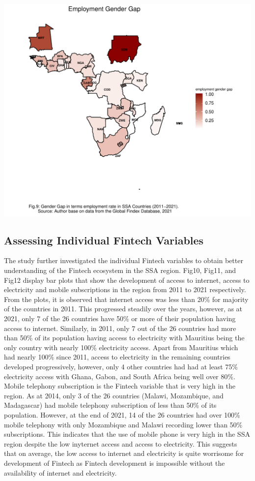 \documentclass[preprint, 3p,
authoryear]{elsarticle} %
\begin{document}
\includegraphics{504.Project1_files/figure-latex/unnamed-chunk-5-1.pdf}

\hypertarget{assessing-individual-fintech-variables}{%
\subsection{Assessing Individual Fintech
Variables}\label{assessing-individual-fintech-variables}}

The study further investigated the individual Fintech variables to
obtain better understanding of the Fintech ecosystem in the SSA region.
Fig10, Fig11, and Fig12 display bar plots that show the development of
access to internet, access to electricity and mobile subscriptions in
the region from 2011 to 2021 respectively. From the plots, it is
observed that internet access was less than 20\% for majority of the
countries in 2011. This progressed steadily over the years, however, as
at 2021, only 7 of the 26 countries have 50\% or more of their
population having access to internet. Similarly, in 2011, only 7 out of
the 26 countries had more than 50\% of its population having access to
electricity with Mauritius being the only country with nearly 100\%
electricity access. Apart from Mauritius which had nearly 100\% since
2011, access to electricity in the remaining countries developed
progressively, however, only 4 other countries had had at least 75\%
electricity access with Ghana, Gabon, and South Africa being well over
80\%. Mobile telephony subscription is the Fintech variable that is very
high in the region. As at 2014, only 3 of the 26 countries (Malawi,
Mozambique, and Madagascar) had mobile telephony subscription of less
than 50\% of its population. However, at the end of 2021, 14 of the 26
countries had over 100\% mobile telephony with only Mozambique and
Malawi recording lower than 50\% subscriptions. This indicates that the
use of mobile phone is very high in the SSA region despite the low
inyternet access and access to electricity. This suggests that on
average, the low access to internet and electricity is quite worrisome
for development of Fintech as Fintech development is impossible without
the availability of internet and electricity.
\end{document}
